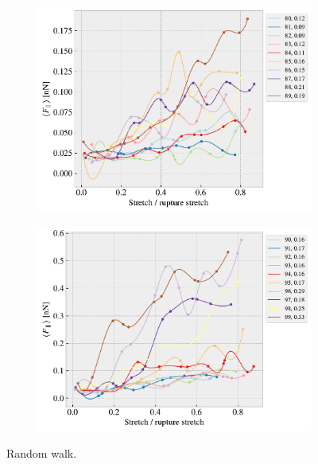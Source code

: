 \begin{figure}[H]
\begin{subfigure}[b]{0.49\textwidth}
        \centering
        \includegraphics[width=\textwidth]{figures/stretch_profiles/RW/SP_8_RW.pdf}
        \caption{}
        \label{fig:}
    \end{subfigure}
    \hfill
    \begin{subfigure}[b]{0.49\textwidth}
        \centering
        \includegraphics[width=\textwidth]{figures/stretch_profiles/RW/SP_9_RW.pdf}
        \caption{}
        \label{fig:}
    \end{subfigure}
    \hfill
    \caption{Random walk.}
    \label{fig:}
\end{figure}
